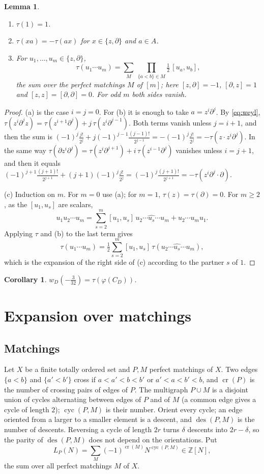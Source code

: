 \documentclass[11pt,a4paper,reqno]{amsart}
\newtheorem{lemma}[theorem]{Lemma}
\newtheorem{corollary}[theorem]{Corollary}
\theoremstyle{definition}
\newcommand{\Z}{\mathbb{Z}}
\newcommand{\cro}{\operatorname{cr}}
\newcommand{\cyc}{\operatorname{cyc}}
\newcommand{\des}{\operatorname{des}}
\newcommand{\dd}{\partial}
\begin{document}
\begin{lemma}\label{lem:tau}
\begin{enumerate}
\item[(a)] $\tau(1)=1$.
\item[(b)] $\tau(xa)=-\tau(ax)$ for $x\in\{z,\dd\}$ and $a\in A$.
\item[(c)] For $u_1,\dots,u_m\in\{z,\dd\}$,
\[
\tau(u_1\cdots u_m)=\sum_{M}\ \prod_{\{a<b\}\in M}\tfrac12\,[u_a,u_b],
\]
the sum over the perfect matchings $M$ of $[m]$; here $[z,\dd]=-1$, $[\dd,z]=1$ and $[z,z]=[\dd,\dd]=0$. For odd $m$ both sides vanish.
\end{enumerate}
\end{lemma}

\begin{proof}
(a) is the case $i=j=0$. For (b) it is enough to take $a=z^i\dd^j$. By \eqref{eq:weyl}, $\tau(z^i\dd^jz)=\tau(z^{i+1}\dd^j)+j\,\tau(z^i\dd^{j-1})$. Both terms vanish unless $j=i+1$, and then the sum is $(-1)^j\frac{j!}{2^j}+j(-1)^{j-1}\frac{(j-1)!}{2^{j-1}}=-(-1)^j\frac{j!}{2^j}=-\tau(z\cdot z^i\dd^j)$. In the same way $\tau(\dd z^i\dd^j)=\tau(z^i\dd^{j+1})+i\,\tau(z^{i-1}\dd^j)$ vanishes unless $i=j+1$, and then it equals $(-1)^{j+1}\frac{(j+1)!}{2^{j+1}}+(j+1)(-1)^j\frac{j!}{2^j}=(-1)^j\frac{(j+1)!}{2^{j+1}}=-\tau(z^i\dd^j\cdot\dd)$.

(c) Induction on $m$. For $m=0$ use (a); for $m=1$, $\tau(z)=\tau(\dd)=0$. For $m\ge2$, as the $[u_1,u_s]$ are scalars,
\[
u_1u_2\cdots u_m=\sum_{s=2}^m[u_1,u_s]\,u_2\cdots\widehat{u_s}\cdots u_m+u_2\cdots u_mu_1 .
\]
Applying $\tau$ and (b) to the last term gives
\[
\tau(u_1\cdots u_m)=\tfrac12\sum_{s=2}^m[u_1,u_s]\,\tau(u_2\cdots\widehat{u_s}\cdots u_m),
\]
which is the expansion of the right side of (c) according to the partner $s$ of $1$.
\end{proof}

\begin{corollary}\label{cor:tau}
$w_D(-\frac{3}{32})=\tau(\varphi(C_D))$.
\end{corollary}

\section{Expansion over matchings}\label{sec:matching}

\subsection{Matchings}
Let $X$ be a finite totally ordered set and $P,M$ perfect matchings of $X$. Two edges $\{a<b\}$ and $\{a'<b'\}$ cross if $a<a'<b<b'$ or $a'<a<b'<b$, and $\cro(P)$ is the number of crossing pairs of edges of $P$. The multigraph $P\cup M$ is a disjoint union of cycles alternating between edges of $P$ and of $M$ (a common edge gives a cycle of length $2$); $\cyc(P,M)$ is their number. Orient every cycle; an edge oriented from a larger to a smaller element is a descent, and $\des(P,M)$ is the number of descents. Reversing a cycle of length $2r$ turns $\delta$ descents into $2r-\delta$, so the parity of $\des(P,M)$ does not depend on the orientations. Put
\[
L_P(N)=\sum_M(-1)^{\cro(M)}N^{\cyc(P,M)}\in\Z[N],
\]
the sum over all perfect matchings $M$ of $X$.
\end{document}
